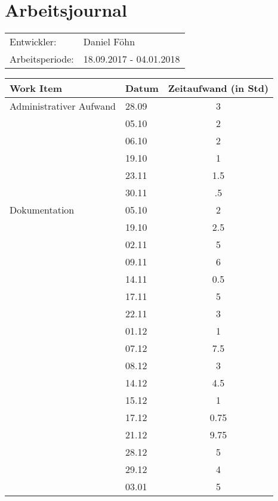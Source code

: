 \documentclass[a4paper, 10pt, fleqn]{article}
\newcommand{\header}{\textbf{Work Item}&\textbf{Datum}&\textbf{Zeitaufwand (in Std)}\\\toprule}
\begin{document}
	\section*{Arbeitsjournal}
    \begin{tabular}{ll}
        Entwickler: & Daniel Föhn \\
        Arbeitsperiode: & 18.09.2017 - 04.01.2018\\
    \end{tabular}
	\begin{longtable}{p{9cm}|p{2cm}|c}
        \header

        Administrativer Aufwand & 28.09 & 3\\
        & 05.10 & 2\\
        & 06.10 & 2\\
        & 19.10 & 1\\
        & 23.11 & 1.5\\
        & 30.11 & .5\\
        
        Dokumentation & 05.10 & 2\\
        & 19.10 & 2.5\\
        & 02.11 & 5\\
        & 09.11 & 6\\
        & 14.11 & 0.5\\
        & 17.11 & 5\\
        & 22.11 & 3\\
        & 01.12 & 1\\
        & 07.12 & 7.5\\
        & 08.12 & 3\\
        & 14.12 & 4.5\\
        & 15.12 & 1\\
        & 17.12 & 0.75\\
        & 21.12 & 9.75\\
        & 28.12 & 5\\
        & 29.12 & 4\\
        & 03.01 & 5\\
        

\end{longtable}
\end{document}
